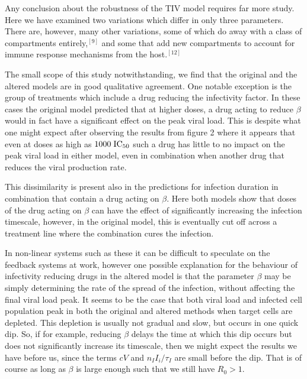 \documentclass[a4paper,11pt]{article}
\begin{document}
Any conclusion about the robustness of the TIV model requires far more study. Here we have examined two variations which differ in only three parameters. There are, however, many other variations, some of which do away with a class of compartments entirely,$^{[9]}$ and some that add new compartments to account for immune response mechanisms from the host.$^{[12]}$ 

The small scope of this study notwithstanding, we find that the original and the altered models are in good qualitative agreement. One notable exception is the group of treatments which include a drug reducing the infectivity factor. In these cases the original model predicted that at higher doses, a drug acting to reduce $\beta$ would in fact have a significant effect on the peak viral load. This is despite what one might expect after observing the results from figure 2 where it appears that even at doses as high as $1000 \hspace{1mm} \mathrm{IC}_{50}$ such a drug has little to no impact on the peak viral load in either model, even in combination when another drug that reduces the viral production rate. 

This dissimilarity is present also in the predictions for infection duration in combination that contain a drug acting on $\beta$. Here both models show that doses of the drug acting on $\beta$ can have the effect of significantly increasing the infection timescale, however, in the original model, this is eventually cut off across a treatment line where the combination cures the infection. 

In non-linear systems such as these it can be difficult to speculate on the feedback systems at work, however one possible explanation for the behaviour of infectivity reducing drugs in the altered model is that the parameter $\beta$ may be simply determining the rate of the spread of the infection, without affecting the final viral load peak. It seems to be the case that both viral load and infected cell population peak in both the original and altered methods when target cells are depleted. This depletion is usually not gradual and slow, but occurs in one quick dip. So, if for example, reducing $\beta$ delays the time at which this dip occurs but does not significantly increase its timescale, then we might expect the results we have before us, since the terms $cV$ and $n_II_i/\tau_I$ are small before the dip. That is of course as long as $\beta$ is large enough such that we still have $R_0 > 1$. 
\end{document}
